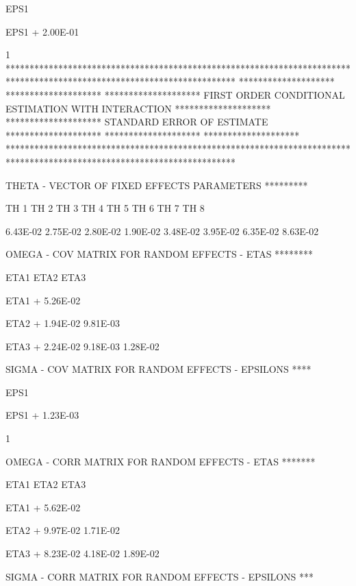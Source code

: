 \documentclass[
  letterpaper,
  toc=chapterentrywithdots,
  listof=totoc,
  11pt,
  headings=small,
  usegeometry]{scrreprt}
\begin{document}
\begin{nonmemlisting}
         EPS1     
 
 EPS1
+        2.00E-01
 
1
 ************************************************************************************************************************
 ********************                                                                                ********************
 ********************               FIRST ORDER CONDITIONAL ESTIMATION WITH INTERACTION              ********************
 ********************                            STANDARD ERROR OF ESTIMATE                          ********************
 ********************                                                                                ********************
 ************************************************************************************************************************
 


 THETA - VECTOR OF FIXED EFFECTS PARAMETERS   *********

         TH 1      TH 2      TH 3      TH 4      TH 5      TH 6      TH 7      TH 8     
 
         6.43E-02  2.75E-02  2.80E-02  1.90E-02  3.48E-02  3.95E-02  6.35E-02  8.63E-02
 


 OMEGA - COV MATRIX FOR RANDOM EFFECTS - ETAS  ********

         ETA1      ETA2      ETA3     
 
 ETA1
+        5.26E-02
 
 ETA2
+        1.94E-02  9.81E-03
 
 ETA3
+        2.24E-02  9.18E-03  1.28E-02
 


 SIGMA - COV MATRIX FOR RANDOM EFFECTS - EPSILONS  ****

         EPS1     
 
 EPS1
+        1.23E-03
 
1


 OMEGA - CORR MATRIX FOR RANDOM EFFECTS - ETAS  *******

         ETA1      ETA2      ETA3     
 
 ETA1
+        5.62E-02
 
 ETA2
+        9.97E-02  1.71E-02
 
 ETA3
+        8.23E-02  4.18E-02  1.89E-02
 


 SIGMA - CORR MATRIX FOR RANDOM EFFECTS - EPSILONS  ***


\end{nonmemlisting}
\end{document}
